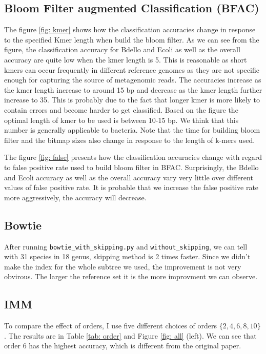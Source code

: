 \documentclass[12pt]{article} %
\begin{document}
\subsection{Bloom Filter augmented Classification (BFAC)}
The figure \ref{fig: kmer} shows how the classification accuracies change in response to the specified Kmer length when build the bloom filter. As we can see from the figure, the classification accuracy for Bdello and Ecoli as well as the overall accuracy are quite low when the kmer length is 5. This is reasonable as short kmers can occur frequently in different reference genomes as they are not specific enough for capturing the source of metagenomic reads. The accuracies increase as the kmer length increase to around 15 bp and decrease as the kmer length further increase to 35. This is probably due to the fact that longer kmer is more likely to contain errors and become harder to get classified. Based on the figure the optimal length of kmer to be used is between 10-15 bp. We think that this number is generally applicable to bacteria. Note that the time for building bloom filter and the bitmap sizes also change in response to the length of k-mers used.

The figure \ref{fig: false} presents how the classification accuracies change with regard to false positive rate used to build bloom filter in BFAC. Surprisingly, the Bdello and Ecoli accuracy as well as the overall accuracy vary very little over different values of false positive rate. It is probable that we increase the false positive rate more aggressively, the accuracy will decrease.

\subsection{Bowtie}
After running \verb|bowtie_with_skipping.py| and \verb|without_skipping|, we can tell with 31 species in 18 genus, skipping method is 2 times faster. Since we didn't make the index for the whole subtree we used, the improvement is not very obvirous. The larger the reference set it is the more improvment we can observe.

\subsection{IMM}
To compare the effect of orders, I use five different choices of orders $\{2, 4, 6, 8, 10\}$. The results are in 
Table \ref{tab: order} and Figure \ref{fig: all} (left). We can see that order $6$ has the highest accuracy, which is different from the original paper. 
\end{document}
